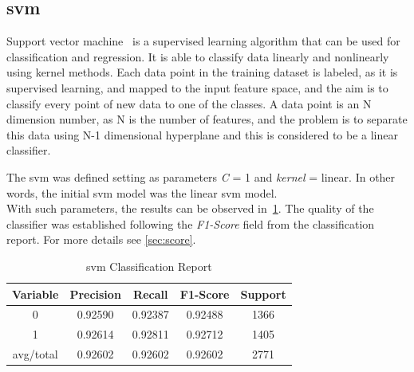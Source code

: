 \subsection{\acf{svm}}
Support vector machine~\cite{svm} is a supervised learning algorithm that can be used for classification and regression. It is able to classify data linearly and nonlinearly using kernel methods. Each data point in the training dataset is labeled, as it is supervised learning, and mapped to the input feature space, and the aim is to classify every point of new data to one of the classes. A data point is an N dimension number, as N is the number of features, and the problem is to separate this data using N-1 dimensional hyperplane and this is considered to be a linear classifier.\par
The \ac{svm} was defined setting as parameters \textit{C} = 1 and \textit{kernel} = linear. In other words, the initial \ac{svm} model was the linear \ac{svm} model.\\
With such parameters, the results can be observed in~\cref{tab:sv1}. The quality of the classifier was established following the \textit{F1-Score} field from the classification report. For more details see \cref{sec:score}. 

\begin{table}[h!]
	\centering
	\begin{tabular}{||c c c c c||} 
		\hline
		Variable & Precision & Recall & F1-Score & Support \\ [0.5ex] 
		\hline\hline
		0 & 0.92590 & 0.92387 & 0.92488 & 1366 \\ 
		1 & 0.92614 & 0.92811 & 0.92712 & 1405 \\
		avg/total & 0.92602 & 0.92602 & 0.92602 & 2771 \\
		[1ex] 
		\hline
	\end{tabular}
	\caption{\acl{svm} Classification Report}
	\label{tab:sv1}
\end{table}

